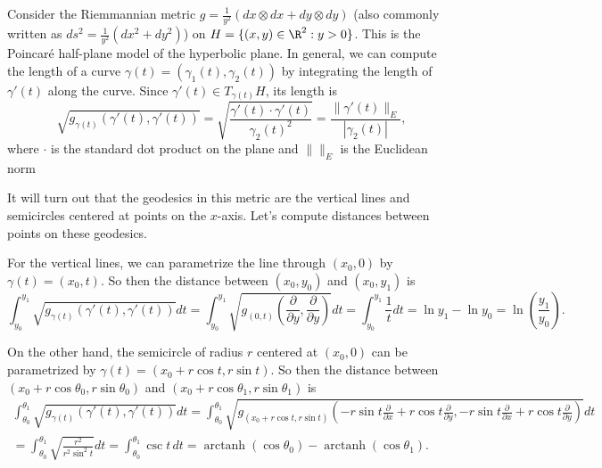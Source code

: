 \begin{example}
	Consider the Riemmannian metric $g = \frac{1}{y^2}(dx \otimes dx + dy \otimes dy)$ (also commonly written as $ds^2 = \frac{1}{y^2}(dx^2 + dy^2)$) on $H = \{(x,y) \in \R^2 : y > 0\}$. This is the Poincaré half-plane model of the hyperbolic plane. In general, we can compute the length of a curve $\gamma(t) = (\gamma_1(t),\gamma_2(t))$ by integrating the length of $\gamma'(t)$ along the curve. Since $\gamma'(t) \in T_{\gamma(t)}H$, its length is 
	\[
		\sqrt{g_{\gamma(t)}(\gamma'(t),\gamma'(t))} = \sqrt{\frac{\gamma'(t) \cdot \gamma'(t)}{\gamma_2(t)^2}} = \frac{\|\gamma'(t)\|_E}{|\gamma_2(t)|},
	\] 
	where $\cdot$ is the standard dot product on the plane and $\| \|_E$ is the Euclidean norm
	
	It will turn out that the geodesics in this metric are the vertical lines and semicircles centered at points on the $x$-axis. Let's compute distances between points on these geodesics.
	
	For the vertical lines, we can parametrize the line through $(x_0,0)$ by $\gamma(t) = (x_0,t)$. So then the distance between $(x_0,y_0)$ and $(x_0,y_1)$ is
	\[
		\int_{y_0}^{y_1} \sqrt{g_{\gamma(t)}(\gamma'(t),\gamma'(t))}dt = \int_{y_0}^{y_1} \sqrt{g_{(0,t)}\left(\frac{\partial}{\partial y},\frac{\partial}{\partial y}\right)} dt = \int_{y_0}^{y_1} \frac{1}{t}dt = \ln {y_1} - \ln {y_0} = \ln \left(\frac{y_1}{y_0}\right).
	\]
	
	On the other hand, the semicircle of radius $r$ centered at $(x_0,0)$ can be parametrized by $\gamma(t) = (x_0 + r \cos t, r \sin t)$. So then the distance between $(x_0 + r \cos \theta_0, r \sin \theta_0)$ and $(x_0 + r \cos \theta_1, r \sin \theta_1)$ is
	\begin{multline*}
		\int_{\theta_0}^{\theta_1} \sqrt{g_{\gamma(t)}(\gamma'(t),\gamma'(t))}dt = \int_{\theta_0}^{\theta_1} \sqrt{g_{(x_0 + r \cos t, r \sin t)}\left(-r \sin t \frac{\partial}{\partial x} + r \cos t \frac{\partial}{\partial y},-r \sin t \frac{\partial}{\partial x} + r \cos t \frac{\partial}{\partial y}\right)}dt \\
		= \int_{\theta_0}^{\theta_1} \sqrt{\frac{r^2}{r^2 \sin^2 t}} dt = \int_{\theta_0}^{\theta_1} \csc t\, dt = \operatorname{arctanh}(\cos\theta_0) - \operatorname{arctanh}(\cos \theta_1).
	\end{multline*}
\end{example}